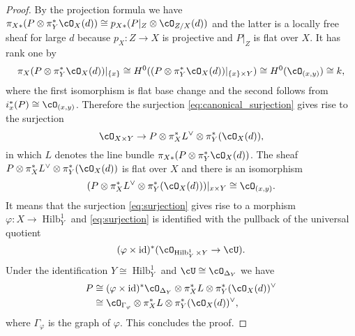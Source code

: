 \documentclass{amsart}
\numberwithin{equation}{section}
\theoremstyle{plain}
\theoremstyle{definition}
\DeclareMathOperator{\id}{\mathrm{id}}
\DeclareMathOperator{\Hilb}{\mathrm{Hilb}}
\begin{document}
\begin{proof}
    By the projection formula we have $\pi_{X*}(P \otimes \pi_Y^* \cO_X(d)) \cong p_{X*}(P\vert_Z \otimes \cO_{Z/X}(d))$ and the latter is a locally free sheaf for large $d$
    because $p_X \colon Z \to X$ is projective and $P\vert_Z$ is flat over $X$.
    It has rank one by
    \begin{equation}
        \pi_{X}(P \otimes \pi_Y^* \cO_X(d))\vert_{\{x\}} \cong H^0((P \otimes \pi_Y^* \cO_X(d))\vert_{\{x\} \times Y}) \cong H^0(\cO_{(x, y)}) \cong k,
    \end{equation}
    where the first isomorphism is flat base change and the second follows from $i_x^*(P) \cong \cO_{(x, y)}$.
    Therefore the surjection \eqref{eq:canonical_surjection} gives rise to the surjection
    \begin{equation}\label{eq:surjection}
        \cO_{X \times Y} \to P \otimes \pi_X^*L^\vee \otimes \pi_Y^*(\cO_X(d)),
    \end{equation}
    in which $L$ denotes the line bundle $\pi_{X*}(P \otimes \pi_Y^* \cO_X(d))$.
    The sheaf $P \otimes \pi_X^*L^\vee \otimes \pi_Y^*(\cO_X(d))$ is flat over $X$ and there is an isomorphism
    \begin{equation}
        (P \otimes \pi_X^*L^\vee \otimes \pi_Y^*(\cO_X(d)))\vert_{x \times Y} \cong \cO_{(x, y)}.
    \end{equation}
    It means that the surjection \eqref{eq:surjection} gives rise to a morphism $\varphi \colon X \to \Hilb_{Y}^1$ and \eqref{eq:surjection} is identified with the pullback of the universal quotient
    \begin{equation}
        (\varphi \times \id)^*(\cO_{\Hilb_{Y}^1 \times Y} \to \cU).
    \end{equation}
    Under the identification $Y \cong \Hilb_{Y}^1$ and $\cU \cong \cO_{\Delta_{Y}}$ we have
    \begin{align}
        P & \cong (\varphi \times \id)^*\cO_{\Delta_{Y}} \otimes \pi_X^*L \otimes \pi_Y^*(\cO_X(d))^\vee \\
          & \cong \cO_{\Gamma_\varphi} \otimes \pi_X^*L \otimes \pi_Y^*(\cO_X(d))^\vee,
    \end{align}
    where $\Gamma_\varphi$ is the graph of $\varphi$.
    This concludes the proof.
\end{proof}
\end{document}
